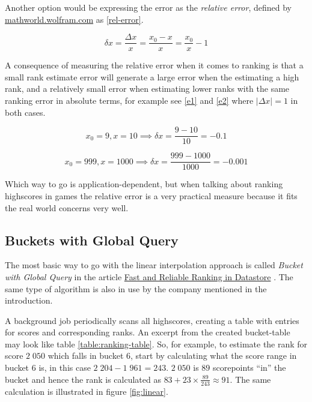 Another option would be expressing the error as the \emph{relative error}, defined by \href{http://mathworld.wolfram.com/RelativeError.html}{mathworld.wolfram.com}
as \ref{rel-error}.

\begin{equation}
  \label{rel-error}
  \delta x = \frac{\Delta x}{x} = \frac{x_0 - x}{x} = \frac{x_0}{x} - 1
\end{equation}

A consequence of measuring the relative error when it comes to ranking is that a small rank estimate error will generate a large error when the estimating a high rank, and a relatively small error when estimating lower ranks with the same ranking error in absolute terms, for example see \ref{e1} and \ref{e2} where $|\Delta x| = 1$ in both cases.

\begin{equation}
  \label{e1}
x_0 = 9, x = 10 \implies \delta x = \frac{9 - 10}{10} = -0.1  
\end{equation}

\begin{equation}
  \label{e2}
x_0 = 999, x = 1000 \implies \delta x = \frac{999 - 1000}{1000} = -0.001  
  \end{equation}


Which way to go is application-dependent, but when talking about ranking highscores in games the relative error is a very practical measure because it fits the real world concerns very well.

\subsection{\label{bucket}Buckets with Global Query}

The most basic way to go with the linear interpolation approach is called \emph{Bucket with Global Query} in the article \href{https://cloud.google.com/datastore/docs/articles/fast-and-reliable-ranking-in-datastore/}{Fast and Reliable Ranking in Datastore} \cite{ranking-in-datastore}. The same type of algorithm is also in use by the company mentioned in the introduction.

A background job periodically scans all highscores, creating a table with entries for scores and corresponding ranks. An excerpt from the created bucket-table may look like table \ref{table:ranking-table}. So, for example, to estimate the rank for score $2\;050$ which falls in bucket 6, start by calculating what the score range in bucket 6 is, in this case $2\;204 - 1\;961 = 243$. $2\;050$ is $89$ scorepoints ``in'' the bucket and hence the rank is calculated as $83 + 23 \times \frac{89}{243} \approx 91$. The same calculation is illustrated in figure \ref{fig:linear}.

